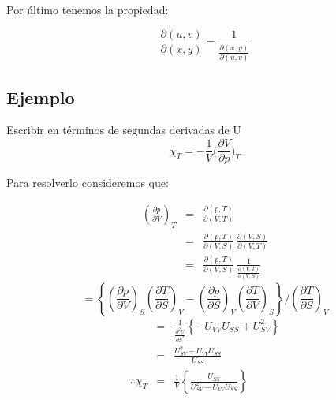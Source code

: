 \documentclass[10pt,twocolumn]{IEEEtran2e}
\begin{document}
Por \'ultimo tenemos la propiedad:

\begin{equation}
 \frac{\partial (u,v)}{\partial (x,y)} = \frac{1}{\frac{\partial (x,y)}{\partial (u,v)}}
\end{equation}


\subsection*{Ejemplo}
Escribir en t\'erminos de segundas derivadas de U
\begin{equation}
 \chi_{T} = - \frac{1}{V} \bigg(\frac{\partial V}{\partial p}\bigg)_{T}
\end{equation}

Para resolverlo consideremos que:

\begin{eqnarray}
 \left(\frac{\partial p}{\partial V}\right)_{T} &=& \frac{\partial (p,T)}{\partial (V,T)} \\
 & = & \frac{\partial (p,T)}{\partial (V,S)} \, \frac{\partial (V,S)}{\partial (V,T)} \\
 & = & \frac{\partial (p,T)}{\partial (V,S)} \, \frac{1}{\frac{\partial (V,T)}{\partial (V,S)}}
\end{eqnarray}
\begin{equation}
 = \left\{ \left(\frac{\partial p}{\partial V}\right)_{S} \left(\frac{\partial T}{\partial S}\right)_{V} - \left(\frac{\partial p}{\partial S}\right)_{V}\left(\frac{\partial T}{\partial V}\right)_{S}\right\} \bigg/ \left(\frac{\partial T}{\partial S}\right)_{V}
\end{equation}
\begin{eqnarray}
 & = & \frac{1}{\frac{\partial^{2}U}{\partial S^{2}}} \left\{-U_{VV}U_{SS} + U^{2}_{SV}  \right\} \\
 & = & \frac{U^{2}_{SV}-U_{VV}U_{SS}}{U_{SS}}\\
\therefore  \chi_{T} & = & \frac{1}{V}\left\{\frac{U_{SS}}{U^{2}_{SV}-U_{VV}U_{SS}} \right\}
\end{eqnarray}
\end{document}

